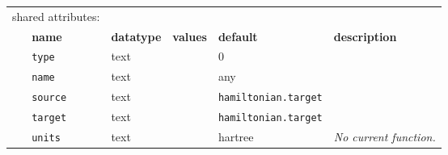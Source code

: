 \begin{table}[h]
\begin{center}
\begin{tabularx}{\textwidth}{l l l l l l }
\multicolumn{2}{l}{shared attributes:} & \multicolumn{4}{l}{}\\
   &   \bfseries name     & \bfseries datatype & \bfseries values & \bfseries default   & \bfseries description \\
   &   \texttt{type}          &  text              &                  & 0                   &                       \\
   &   \texttt{name}          &  text              &                  & any                 &                       \\
   &   \texttt{source}        &  text              &                  &\texttt{hamiltonian.target}&                       \\
   &   \texttt{target}        &  text              &                  &\texttt{hamiltonian.target}&                       \\
   &   \texttt{units}         &  text              &                  & hartree             & \textit{No current function.}  \\
\hline
\end{tabularx}
\end{center}
\end{table}

%







